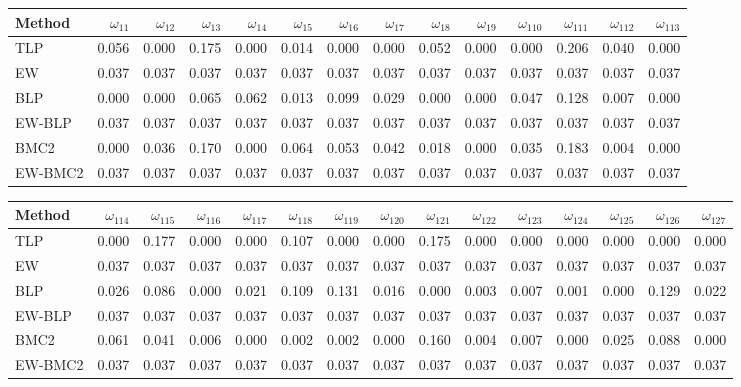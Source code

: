 \documentclass[
]{article}
\begin{document}
\begin{tabular}{lrrrrrrrrrrrrr}
\toprule
Method & $\omega_{11}$ & $\omega_{12}$ & $\omega_{13}$ & $\omega_{14}$ & $\omega_{15}$ & $\omega_{16}$ & $\omega_{17}$ & $\omega_{18}$ & $\omega_{19}$ & $\omega_{110}$ & $\omega_{111}$ & $\omega_{112}$ & $\omega_{113}$\\
\midrule
TLP & 0.056 & 0.000 & 0.175 & 0.000 & 0.014 & 0.000 & 0.000 & 0.052 & 0.000 & 0.000 & 0.206 & 0.040 & 0.000\\
EW & 0.037 & 0.037 & 0.037 & 0.037 & 0.037 & 0.037 & 0.037 & 0.037 & 0.037 & 0.037 & 0.037 & 0.037 & 0.037\\
BLP & 0.000 & 0.000 & 0.065 & 0.062 & 0.013 & 0.099 & 0.029 & 0.000 & 0.000 & 0.047 & 0.128 & 0.007 & 0.000\\
EW-BLP & 0.037 & 0.037 & 0.037 & 0.037 & 0.037 & 0.037 & 0.037 & 0.037 & 0.037 & 0.037 & 0.037 & 0.037 & 0.037\\
BMC2 & 0.000 & 0.036 & 0.170 & 0.000 & 0.064 & 0.053 & 0.042 & 0.018 & 0.000 & 0.035 & 0.183 & 0.004 & 0.000\\
EW-BMC2 & 0.037 & 0.037 & 0.037 & 0.037 & 0.037 & 0.037 & 0.037 & 0.037 & 0.037 & 0.037 & 0.037 & 0.037 & 0.037\\
\bottomrule
\end{tabular}

\begin{tabular}{lrrrrrrrrrrrrrr}
\toprule
Method & $\omega_{114}$ & $\omega_{115}$ & $\omega_{116}$ & $\omega_{117}$ & $\omega_{118}$ & $\omega_{119}$ & $\omega_{120}$ & $\omega_{121}$ & $\omega_{122}$ & $\omega_{123}$ & $\omega_{124}$ & $\omega_{125}$ & $\omega_{126}$ & $\omega_{127}$\\
\midrule
TLP & 0.000 & 0.177 & 0.000 & 0.000 & 0.107 & 0.000 & 0.000 & 0.175 & 0.000 & 0.000 & 0.000 & 0.000 & 0.000 & 0.000\\
EW & 0.037 & 0.037 & 0.037 & 0.037 & 0.037 & 0.037 & 0.037 & 0.037 & 0.037 & 0.037 & 0.037 & 0.037 & 0.037 & 0.037\\
BLP & 0.026 & 0.086 & 0.000 & 0.021 & 0.109 & 0.131 & 0.016 & 0.000 & 0.003 & 0.007 & 0.001 & 0.000 & 0.129 & 0.022\\
EW-BLP & 0.037 & 0.037 & 0.037 & 0.037 & 0.037 & 0.037 & 0.037 & 0.037 & 0.037 & 0.037 & 0.037 & 0.037 & 0.037 & 0.037\\
BMC2 & 0.061 & 0.041 & 0.006 & 0.000 & 0.002 & 0.002 & 0.000 & 0.160 & 0.004 & 0.007 & 0.000 & 0.025 & 0.088 & 0.000\\
EW-BMC2 & 0.037 & 0.037 & 0.037 & 0.037 & 0.037 & 0.037 & 0.037 & 0.037 & 0.037 & 0.037 & 0.037 & 0.037 & 0.037 & 0.037\\
\bottomrule
\end{tabular}
\end{document}
